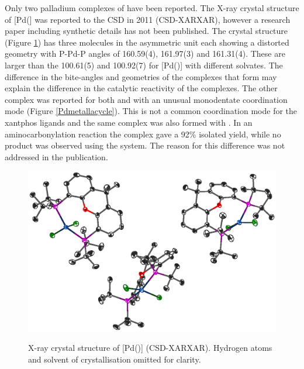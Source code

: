 Only two palladium complexes of \tBuxantphos{} have been reported.  The X-ray crystal structure of [Pd(\tBuxantphos{}] was reported to the \gls{CSD} in 2011 (CSD-XARXAR), however a research paper including synthetic details has not been published.\cite{Allen2002}  The crystal structure (Figure \ref{PdtBuxantphos}) has three molecules in the asymmetric unit each showing a distorted \trans{} geometry with P-Pd-P angles of 160.59(4), 161.97(3) and 161.31(4)\degrees{}.  These are larger than the 100.61(5) and 100.92(7)\degrees{} for [Pd(\Phxantphos)] with different solvates.\cite{Allen2002, Johns2006, Jahromi2012}  The difference in the bite-angles and geometries of the complexes that form may explain the difference in the catalytic reactivity of the complexes.  The other complex was reported for both \tBuxantphos{} and \Phxantphos{} with an unusual monodentate coordination mode (Figure \ref{Pdmetallacycle}).\cite{Friis2014}  This is not a common coordination mode for the xantphos ligands and the same complex was also formed with \Phxantphos{}.  In an aminocarbonylation reaction the \Phxantphos{} complex gave a 92\% isolated yield, while no product was observed using the \tBuxantphos{} system.  The reason for this difference was not addressed in the publication.

\begin{figure}[htbp]
\begin{center}
\vspace{0.5cm}
\includegraphics[width=\textwidth]{../Othercrystals/PdtBuxantphos.eps}
\caption[X-ray crystal structure of [Pd(\tBuxantphos)\ce{Cl2}{]}]{X-ray crystal structure of [Pd(\tBuxantphos)] (CSD-XARXAR).\cite{Allen2002}  Hydrogen atoms and solvent of crystallisation omitted for clarity.}
\vspace{0.2cm}
\label{PdtBuxantphos}
\end{center}
\end{figure}
\vspace{0.2cm}

